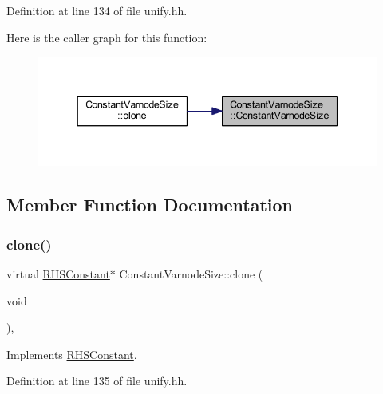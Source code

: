 Definition at line 134 of file unify.\+hh.

Here is the caller graph for this function\+:
\nopagebreak
\begin{figure}[H]
\begin{center}
\leavevmode
\includegraphics[width=344pt]{class_constant_varnode_size_a403abf1a08b7ee1b029cd88e4d05140e_icgraph}
\end{center}
\end{figure}


\subsection{Member Function Documentation}
\mbox{\label{class_constant_varnode_size_ad8386fe9afbedfaa9fa8c17be0dd697c}} 
\subsubsection{\texorpdfstring{clone()}{clone()}}
{\footnotesize\ttfamily virtual \mbox{\hyperlink{class_r_h_s_constant}{R\+H\+S\+Constant}}$\ast$ Constant\+Varnode\+Size\+::clone (\begin{DoxyParamCaption}\item[{void}]{ }\end{DoxyParamCaption})\hspace{0.3cm}{\ttfamily [inline]}, {\ttfamily [virtual]}}



Implements \mbox{\hyperlink{class_r_h_s_constant_a3e43335a89351a453932a8c0544d5722}{R\+H\+S\+Constant}}.



Definition at line 135 of file unify.\+hh.

